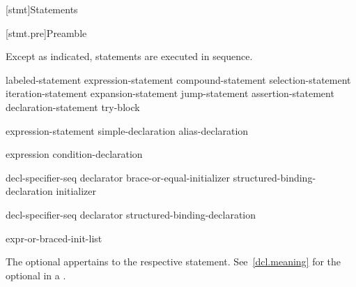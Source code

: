 [stmt]{Statements}%



[stmt.pre]{Preamble}

\pnum
Except as indicated, statements are executed in sequence.

\begin{bnf}
\br
    labeled-statement\br
     expression-statement\br
     compound-statement\br
     selection-statement\br
     iteration-statement\br
     expansion-statement\br
     jump-statement\br
     assertion-statement\br
    declaration-statement\br
     try-block
\end{bnf}

\begin{bnf}
\br
    expression-statement\br
    simple-declaration\br
    alias-declaration
\end{bnf}

\begin{bnf}
\br
    expression\br
    condition-declaration
\end{bnf}

\begin{bnf}
\br
     decl-specifier-seq declarator brace-or-equal-initializer\br
    structured-binding-declaration initializer
\end{bnf}

\begin{bnf}
\br
     decl-specifier-seq declarator\br
    structured-binding-declaration
\end{bnf}

\begin{bnf}
\br
    expr-or-braced-init-list
\end{bnf}

The optional  appertains to the respective statement.
See~\ref{dcl.meaning} for the optional  in a
.

